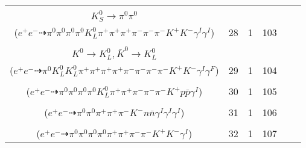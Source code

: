 \documentclass[landscape]{article}
\newcounter{rownumbers}
\newcommand\rn{\stepcounter{rownumbers}\arabic{rownumbers}}
\newcommand{\EOL}{\\} %
\newcommand{\topoTags}[1]{#1} %
\begin{document}
\begin{longtable}{clcccc}
\rn & \makecell[l]{ $ 
e^{+} e^{-} \rightarrow \pi^{0} \rho^{0} \pi^{+} \pi^{-} \rho^{+} K^{0} \bar{K}^{0} K^{*} K^{-} \gamma^{I} \gamma^{I} ,
\rho^{0} \rightarrow \pi^{+} \pi^{-} ,
\rho^{+} \rightarrow \pi^{0} \pi^{+} ,
K^{0} \rightarrow K_{L}^{0} ,
\bar{K}^{0} \rightarrow K_{S}^{0} ,
K^{*} \rightarrow \pi^{-} K^{+} ,
$ \\ $
K_{S}^{0} \rightarrow \pi^{0} \pi^{0} 
$ \\ ($
e^{+} e^{-} \dashrightarrow \pi^{0} \pi^{0} \pi^{0} \pi^{0} K_{L}^{0} \pi^{+} \pi^{+} \pi^{+} \pi^{-} \pi^{-} \pi^{-} K^{+} K^{-} \gamma^{I} \gamma^{I} 
$) } & \topoTags{28 & }1 & 103 \EOL

\rn & \makecell[l]{ $ 
e^{+} e^{-} \rightarrow \rho^{0} \pi^{+} \pi^{-} \rho^{+} K^{*} K^{-} K^{*+} K^{*-} \gamma^{I} ,
\rho^{0} \rightarrow \pi^{+} \pi^{-} \gamma^{F} ,
\rho^{+} \rightarrow \pi^{0} \pi^{+} ,
K^{*} \rightarrow \pi^{-} K^{+} ,
K^{*+} \rightarrow \pi^{+} K^{0} ,
K^{*-} \rightarrow \pi^{-} \bar{K}^{0} ,
$ \\ $
K^{0} \rightarrow K_{L}^{0} ,
\bar{K}^{0} \rightarrow K_{L}^{0} 
$ \\ ($
e^{+} e^{-} \dashrightarrow \pi^{0} K_{L}^{0} K_{L}^{0} \pi^{+} \pi^{+} \pi^{+} \pi^{+} \pi^{-} \pi^{-} \pi^{-} \pi^{-} K^{+} K^{-} \gamma^{I} \gamma^{F} 
$) } & \topoTags{29 & }1 & 104 \EOL

\rn & \makecell[l]{ $ 
e^{+} e^{-} \rightarrow \pi^{0} \pi^{0} \pi^{+} \rho^{-} \omega \bar{K}^{0} K^{*} p \bar{p} \gamma^{I} ,
\rho^{-} \rightarrow \pi^{0} \pi^{-} ,
\omega \rightarrow \pi^{0} \pi^{+} \pi^{-} ,
\bar{K}^{0} \rightarrow K_{L}^{0} ,
K^{*} \rightarrow \pi^{-} K^{+} 
$ \\ ($
e^{+} e^{-} \dashrightarrow \pi^{0} \pi^{0} \pi^{0} \pi^{0} K_{L}^{0} \pi^{+} \pi^{+} \pi^{-} \pi^{-} \pi^{-} K^{+} p \bar{p} \gamma^{I} 
$) } & \topoTags{30 & }1 & 105 \EOL

\rn & \makecell[l]{ $ 
e^{+} e^{-} \rightarrow \pi^{0} \pi^{+} \bar{K}^{*} \Delta^{-} \bar{\Lambda} \gamma^{I} \gamma^{I} \gamma^{I} ,
\bar{K}^{*} \rightarrow \pi^{+} K^{-} ,
\Delta^{-} \rightarrow \pi^{-} n ,
\bar{\Lambda} \rightarrow \pi^{0} \bar{n} 
$ \\ ($
e^{+} e^{-} \dashrightarrow \pi^{0} \pi^{0} \pi^{+} \pi^{+} \pi^{-} K^{-} n \bar{n} \gamma^{I} \gamma^{I} \gamma^{I} 
$) } & \topoTags{31 & }1 & 106 \EOL

\rn & \makecell[l]{ $ 
e^{+} e^{-} \rightarrow \pi^{0} \pi^{0} \pi^{0} \pi^{0} \rho^{0} \pi^{-} \bar{K}^{*} K^{+} \gamma^{I} ,
\rho^{0} \rightarrow \pi^{+} \pi^{-} ,
\bar{K}^{*} \rightarrow \pi^{+} K^{-} 
$ \\ ($
e^{+} e^{-} \dashrightarrow \pi^{0} \pi^{0} \pi^{0} \pi^{0} \pi^{+} \pi^{+} \pi^{-} \pi^{-} K^{+} K^{-} \gamma^{I} 
$) } & \topoTags{32 & }1 & 107 \EOL


\end{longtable}
\end{document}
